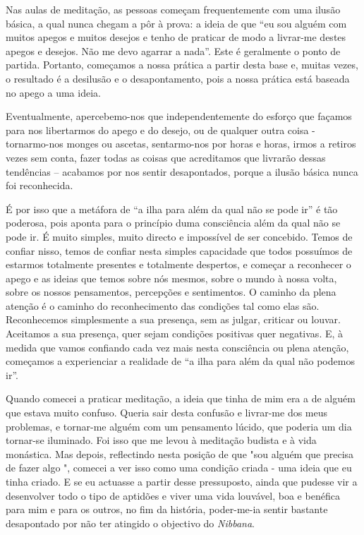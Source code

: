 Nas aulas de meditação, as pessoas começam frequentemente com uma ilusão
básica, a qual nunca chegam a pôr à prova: a ideia de que ``eu sou
alguém com muitos apegos e muitos desejos e tenho de praticar de modo a
livrar-me destes apegos e desejos. Não me devo agarrar a nada''. Este é
geralmente o ponto de partida. Portanto, começamos a nossa prática a
partir desta base e, muitas vezes, o resultado é a desilusão e o
desapontamento, pois a nossa prática está baseada no apego a uma ideia.

Eventualmente, apercebemo-nos que independentemente do esforço que
façamos para nos libertarmos do apego e do desejo, ou de qualquer outra
coisa - tornarmo-nos monges ou ascetas, sentarmo-nos por horas e horas,
irmos a retiros vezes sem conta, fazer todas as coisas que acreditamos
que livrarão dessas tendências -- acabamos por nos sentir desapontados,
porque a ilusão básica nunca foi reconhecida.

É por isso que a metáfora de ``a ilha para além da qual não se pode ir''
é tão poderosa, pois aponta para o princípio duma consciência além da
qual não se pode ir. É muito simples, muito directo e impossível de ser
concebido. Temos de confiar nisso, temos de confiar nesta simples
capacidade que todos possuímos de estarmos totalmente presentes e
totalmente despertos, e começar a reconhecer o apego e as ideias que
temos sobre nós mesmos, sobre o mundo à nossa volta, sobre os nossos
pensamentos, percepções e sentimentos. O caminho da plena atenção é o
caminho do reconhecimento das condições tal como elas são. Reconhecemos
simplesmente a sua presença, sem as julgar, criticar ou louvar.
Aceitamos a sua presença, quer sejam condições positivas quer negativas.
E, à medida que vamos confiando cada vez mais nesta consciência ou plena
atenção, começamos a experienciar a realidade de ``a ilha para além da
qual não podemos ir''.

Quando comecei a praticar meditação, a ideia que tinha de mim era a de
alguém que estava muito confuso. Queria sair desta confusão e livrar-me
dos meus problemas, e tornar-me alguém com um pensamento lúcido, que
poderia um dia tornar-se iluminado. Foi isso que me levou à meditação
budista e à vida monástica. Mas depois, reflectindo nesta posição de que
"sou alguém que precisa de fazer algo ", comecei a ver isso como uma
condição criada - uma ideia que eu tinha criado. E se eu actuasse a
partir desse pressuposto, ainda que pudesse vir a desenvolver todo o
tipo de aptidões e viver uma vida louvável, boa e benéfica para mim e
para os outros, no fim da história, poder-me-ia sentir bastante
desapontado por não ter atingido o objectivo do \emph{Nibbana}.

